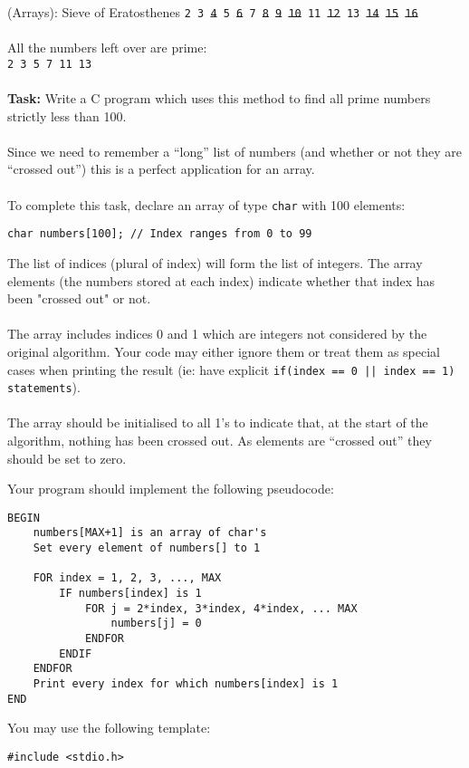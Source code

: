 \documentclass{lab}
\begin{document}
\begin{task}{(Arrays): Sieve of Eratosthenes}{}
\texttt{2 3 \st{4} 5 \st{6} 7 \st{8} \st{9} \st{10} 11 \st{12} 13 \st{14} \st{15} \st{16}}
\\~\\
All the numbers left over are prime:\\
\texttt{2 3 5 7 11 13}
\\~\\
\textbf{Task:} Write a C program which uses this method to find all prime numbers strictly less than 100.
\\~\\
Since we need to remember a ``long'' list of numbers (and whether or not they are ``crossed out'') this is a perfect application for an array.
\\~\\
To complete this task, declare an array of type \texttt{char} with 100 elements:
\begin{lstlisting}[style=Ctable]
char numbers[100]; // Index ranges from 0 to 99
\end{lstlisting}
The list of indices (plural of index) will form the list of integers. The array elements (the numbers stored at each index) indicate whether that index has been "crossed out" or not.
\\~\\
The array includes indices 0 and 1 which are integers not considered by the original algorithm. Your code may either ignore them or treat them as special cases when printing the result (ie: have explicit \texttt{if(index == 0 || index == 1) statements}).
\\~\\
The array should be initialised to all 1's to indicate that, at the start of the algorithm, nothing has been crossed out. As elements are ``crossed out'' they should be set to zero.

\pagebreak
Your program should implement the following pseudocode:
\begin{lstlisting}[style=pseudo]
BEGIN
	numbers[MAX+1] is an array of char's
	Set every element of numbers[] to 1
	
	FOR index = 1, 2, 3, ..., MAX
		IF numbers[index] is 1
			FOR j = 2*index, 3*index, 4*index, ... MAX
				numbers[j] = 0
			ENDFOR
		ENDIF
	ENDFOR
	Print every index for which numbers[index] is 1
END
\end{lstlisting}

You may use the following template:
\begin{lstlisting}[style=Ctable]
#include <stdio.h>


\end{lstlisting}
\end{task}
\end{document}
